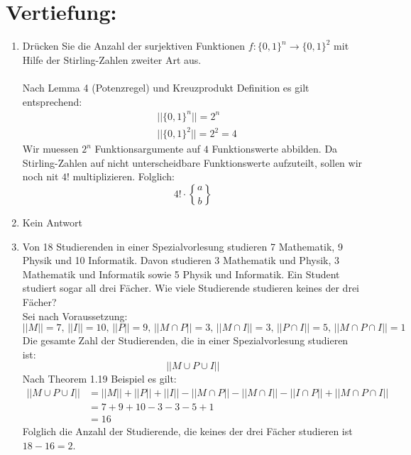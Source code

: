 

\DeclareRobustCommand{\stirling}{\genfrac\{\}{0pt}{}}

    \maketitle
    \section*{Vertiefung:}
    \begin{enumerate}[label=(\alph*)]
        \item Drücken Sie die Anzahl der surjektiven Funktionen 
        $f : \{0, 1\}^n \to \{0, 1\}^2$ mit Hilfe der Stirling-Zahlen zweiter Art aus.\\\\
        Nach Lemma 4 (Potenzregel) und Kreuzprodukt Definition es gilt entsprechend:
        \begin{align*}
	        &||\{0, 1\}^n|| = 2^n \\
	        &|| \{0, 1\}^2|| = 2^2 = 4
	    \end{align*}
	    Wir muessen $2^n$ Funktionsargumente auf $4$ Funktionswerte abbilden. Da Stirling-Zahlen auf 
	    nicht unterscheidbare Funktionswerte aufzuteilt, sollen wir noch nit $4!$ multiplizieren.  
	    Folglich: \[4!\cdot\stirling{a}{b}\]

        \item Kein Antwort

        \item Von 18 Studierenden in einer Spezialvorlesung studieren 7 Mathematik, 9 Physik und 10
		Informatik. Davon studieren 3 Mathematik und Physik, 3 Mathematik und Informatik
		sowie 5 Physik und Informatik. Ein Student studiert sogar all drei Fächer. Wie viele
		Studierende studieren keines der drei Fächer?\\
		Sei nach Voraussetzung:
		\[||M|| = 7,\, ||I|| = 10,\, ||P|| = 9,\, ||M \cap P|| = 3,\, ||M \cap I|| = 3,\, 
		  ||P \cap I|| = 5,\, ||M \cap P \cap I|| = 1\]
		Die gesamte Zahl der Studierenden, die in einer Spezialvorlesung studieren ist:
		\[||M \cup P \cup I||\]
		Nach Theorem 1.19 Beispiel es gilt:
		\begin{align*}
	        ||M\cup P\cup I|| &= ||M||+||P||+||I||-||M\cap P||-||M\cap I||-||I \cap P||+||M \cap P \cap I||\\
	        &= 7 + 9 + 10 - 3 - 3 - 5 + 1 \\
	        &= 16
        \end{align*}
        Folglich die Anzahl der Studierende, die keines der drei Fächer studieren ist $18-16 = 2$.


\end{enumerate}

